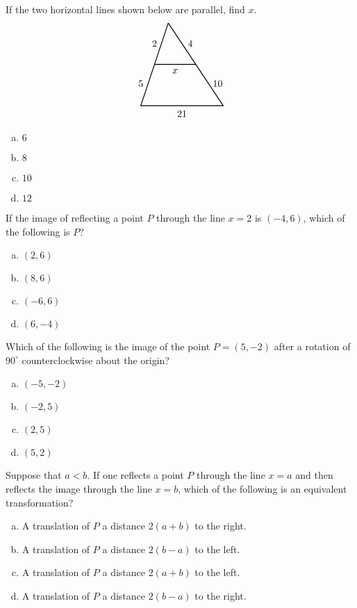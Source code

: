 \documentclass[12pt,letterpaper]{exam}
\begin{document}
\begin{questions}
\question If the two horizontal lines shown below are parallel, find $x$.
	\[
	\begin{tikzpicture}
	\draw[line width=0.03cm] (0,3) -- (-1,0) -- (2,0) -- (0,3);
	\draw[line width=0.03cm] (-0.5,1.5) -- (1,1.5);
	\node at (0.25,1.25) {$x$};
	\node at (0.5,-0.3) {$21$};
	\node at (-0.5,2.25) {$2$};
	\node at (0.8,2.25) {$4$};
	\node at (-1,0.8) {$5$};

	\node at (1.8,0.8) {$10$};
	\end{tikzpicture}
	\]

\begin{enumerate}[(a)]
\item $6$
\item $8$
\item $10$
\item $12$
\end{enumerate} \vfill



\question If the image of reflecting a point $P$ through the line $x= 2$ is $(-4, 6)$, which of the following is $P$?
	\begin{enumerate}[(a)]
	\item $(2, 6)$
	\item $(8, 6)$
	\item $(-6, 6)$
	\item $(6, -4)$
	\end{enumerate} \vfill



\newpage



\question Which of the following is the image of the point $P= (5, -2)$ after a rotation of $90^\circ$ counterclockwise about the origin?
	\begin{enumerate}[(a)]
	\item $(-5, -2)$
	\item $(-2, 5)$
	\item $(2, 5)$
	\item $(5, 2)$
	\end{enumerate} \vfill



\question Suppose that $a < b$. If one reflects a point $P$ through the line $x= a$ and then reflects the image through the line $x= b$, which of the following is an equivalent transformation? 
	\begin{enumerate}[(a)]
	\item A translation of $P$ a distance $2(a + b)$ to the right. 
	\item A translation of $P$ a distance $2(b - a)$ to the left. 
	\item A translation of $P$ a distance $2(a + b)$ to the left.  
	\item A translation of $P$ a distance $2(b - a)$ to the right. 
	\end{enumerate} \vfill
	



\end{questions}
\end{document}
